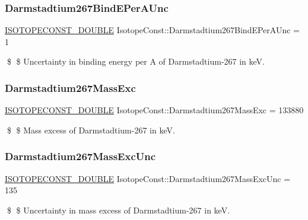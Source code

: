 \subsubsection{\texorpdfstring{Darmstadtium267\+Bind\+E\+Per\+A\+Unc}{Darmstadtium267BindEPerAUnc}}
{\footnotesize\ttfamily \mbox{\hyperlink{group___isotope_const-_macros_ga8f45a7272ce02c0b4c65c44636ed719a}{I\+S\+O\+T\+O\+P\+E\+C\+O\+N\+S\+T\+\_\+\+D\+O\+U\+B\+LE}} Isotope\+Const\+::\+Darmstadtium267\+Bind\+E\+Per\+A\+Unc = 1}

\$ \$ Uncertainty in binding energy per A of Darmstadtium-\/267 in keV. \mbox{\label{group___isotope_const-_darmstadtium-_ds267_ga8fb1448e644cd0052ff5f2d1624b9bdd}} 
\subsubsection{\texorpdfstring{Darmstadtium267\+Mass\+Exc}{Darmstadtium267MassExc}}
{\footnotesize\ttfamily \mbox{\hyperlink{group___isotope_const-_macros_ga8f45a7272ce02c0b4c65c44636ed719a}{I\+S\+O\+T\+O\+P\+E\+C\+O\+N\+S\+T\+\_\+\+D\+O\+U\+B\+LE}} Isotope\+Const\+::\+Darmstadtium267\+Mass\+Exc = 133880}

\$ \$ Mass excess of Darmstadtium-\/267 in keV. \mbox{\label{group___isotope_const-_darmstadtium-_ds267_ga793bc1361cc5385386631c85eb27995f}} 
\subsubsection{\texorpdfstring{Darmstadtium267\+Mass\+Exc\+Unc}{Darmstadtium267MassExcUnc}}
{\footnotesize\ttfamily \mbox{\hyperlink{group___isotope_const-_macros_ga8f45a7272ce02c0b4c65c44636ed719a}{I\+S\+O\+T\+O\+P\+E\+C\+O\+N\+S\+T\+\_\+\+D\+O\+U\+B\+LE}} Isotope\+Const\+::\+Darmstadtium267\+Mass\+Exc\+Unc = 135}

\$ \$ Uncertainty in mass excess of Darmstadtium-\/267 in keV. \mbox{\label{group___isotope_const-_darmstadtium-_ds267_ga9a44db44177be91aded51371c7f2b50e}} 
